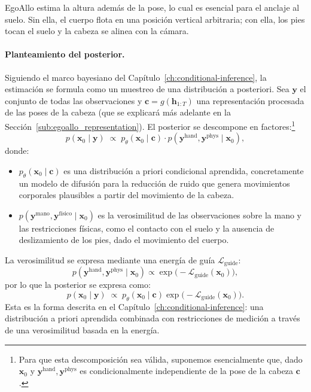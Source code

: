 \documentclass[../../book-main_es.tex]{subfiles}
\begin{document}
EgoAllo estima la altura además de la pose, lo cual es esencial para
el anclaje al suelo. Sin ella, el cuerpo flota en una posición vertical
arbitraria; con ella, los pies tocan el suelo y la cabeza se alinea con la cámara.

\paragraph{Planteamiento del posterior.}
Siguiendo el marco bayesiano del
Capítulo~\ref{ch:conditional-inference}, la estimación se formula como
un muestreo de una distribución a posteriori. Sea $\boldsymbol{y}$ el conjunto de todas las observaciones
y $\boldsymbol{c} = g(\boldsymbol{h}_{1:T})$ una representación procesada de
las poses de la cabeza (que se explicará más adelante en
la Sección~\ref{sub:egoallo_representation}). El posterior se descompone
en factores:\footnote{Para que esta descomposición sea válida, suponemos esencialmente
    que, dado $\boldsymbol{x}_0$ y $\boldsymbol{y}^{\text{hand}},
    \boldsymbol{y}^{\text{phys}}$ es condicionalmente independiente de la pose de la cabeza
$\boldsymbol{c}$.}
\begin{equation}
    p(\boldsymbol{x}_0 \mid \boldsymbol{y}) \;\propto\; p_\theta(\boldsymbol{x}_0 \mid
    \boldsymbol{c}) \cdot p(\boldsymbol{y}^{\text{hand}},
    \boldsymbol{y}^{\text{phys}} \mid \boldsymbol{x}_0),
\end{equation}
donde:
\begin{itemize}
    \item $p_\theta(\boldsymbol{x}_0 \mid \boldsymbol{c})$ es una distribución a priori condicional
        aprendida, concretamente un modelo de difusión para la reducción de ruido
        que genera movimientos corporales plausibles a partir del movimiento de la cabeza.
    \item $p(\boldsymbol{y}^{\text{mano}}, \boldsymbol{y}^{\text{físico}} \mid
        \boldsymbol{x}_0)$ es la verosimilitud de las observaciones sobre la mano y
        las restricciones físicas, como el contacto con el suelo y la ausencia de
        deslizamiento de los pies, dado el movimiento del cuerpo.
\end{itemize}

La verosimilitud se expresa mediante una energía de guía $\mathcal{L}_{\text{guide}}$:
\begin{equation}
    p(\boldsymbol{y}^{\text{hand}}, \boldsymbol{y}^{\text{phys}} \mid
    \boldsymbol{x}_0) \propto \exp\big(-\mathcal{L}_{\text{guide}}(\boldsymbol{x}_0)\big),
\end{equation}
por lo que la posterior se expresa como:
\begin{equation}
    \label{eq:egoallo_posterior}
    p(\boldsymbol{x}_0 \mid \boldsymbol{y}) \;\propto\; p_\theta(\boldsymbol{x}_0 \mid
    \boldsymbol{c}) \exp\big(-\mathcal{L}_{\text{guide}}(\boldsymbol{x}_0)\big).
\end{equation}
Esta es la forma descrita en el Capítulo~\ref{ch:conditional-inference}: una
distribución a priori aprendida combinada con restricciones de medición a través de una
verosimilitud basada en la energía.
\end{document}
